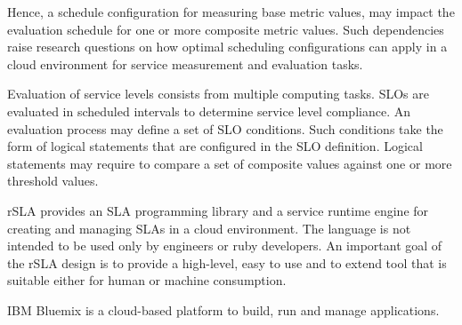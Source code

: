 Hence, a schedule configuration for measuring base metric values, may impact the evaluation schedule for one or more composite metric values. Such dependencies raise research questions on how optimal scheduling configurations can apply in a cloud environment for service measurement and evaluation tasks.
 
Evaluation of service levels consists from multiple computing tasks. SLOs are evaluated in scheduled intervals to determine service level compliance. An evaluation process may define a set of SLO conditions.  Such conditions take the form of logical statements that are configured in the SLO definition. Logical statements may require to compare a set of composite values against one or more threshold values. 

rSLA provides an SLA programming library and a service runtime engine for creating and managing SLAs in a cloud environment. The language is not intended to be used only by engineers or ruby developers. An important goal of the rSLA design is to provide a high-level, easy to use and to extend tool that is suitable either for human or machine consumption.


IBM Bluemix is a cloud-based platform to build, run and manage applications. 
